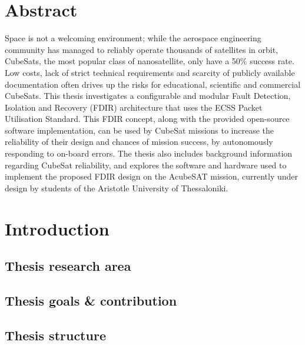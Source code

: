 \documentclass[a4paper,nobib]{tufte-book}
\begin{document}
\cleardoublepage

\chapter*{Abstract}

\justify
Space is not a welcoming environment; while the aerospace engineering community has managed to reliably operate thousands of satellites in orbit, CubeSats, the most popular class of nanosatellite, only have a 50\% success rate. Low costs, lack of strict technical requirements and scarcity of publicly available documentation often drives up the risks for educational, scientific and commercial CubeSats. This thesis investigates a configurable and modular Fault Detection, Isolation and Recovery (FDIR) architecture that uses the ECSS Packet Utilisation Standard. This FDIR concept, along with the provided open-source software implementation, can be used by CubeSat missions to increase the reliability of their design and chances of mission success, by autonomously responding to on-board errors. The thesis also includes background information regarding CubeSat reliability, and explores the software and hardware used to implement the proposed FDIR design on the AcubeSAT mission, currently under design by students of the Aristotle University of Thessaloniki.

 

\mainmatter


\chapter{Introduction}

\section{Thesis research area}

\section{Thesis goals \& contribution}

\section{Thesis structure}
\end{document}
